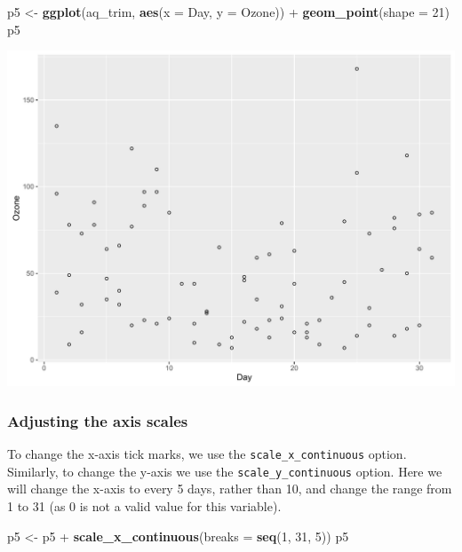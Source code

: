 \documentclass[]{article}
\newenvironment{Shaded}{\begin{snugshade}}{\end{snugshade}}
\newcommand{\KeywordTok}[1]{\textcolor[rgb]{0.13,0.29,0.53}{\textbf{{#1}}}}
\newcommand{\DataTypeTok}[1]{\textcolor[rgb]{0.13,0.29,0.53}{{#1}}}
\newcommand{\DecValTok}[1]{\textcolor[rgb]{0.00,0.00,0.81}{{#1}}}
\newcommand{\StringTok}[1]{\textcolor[rgb]{0.31,0.60,0.02}{{#1}}}
\newcommand{\NormalTok}[1]{{#1}}
\begin{document}
\begin{Shaded}
\begin{Highlighting}[]
\NormalTok{p5 <-}\StringTok{ }\KeywordTok{ggplot}\NormalTok{(aq_trim, }\KeywordTok{aes}\NormalTok{(}\DataTypeTok{x =} \NormalTok{Day, }\DataTypeTok{y =} \NormalTok{Ozone)) +}\StringTok{ }\KeywordTok{geom_point}\NormalTok{(}\DataTypeTok{shape =} \DecValTok{21}\NormalTok{)}
\NormalTok{p5}
\end{Highlighting}
\end{Shaded}

\begin{center}\includegraphics{0_all_posts_pdf/scatter_2-1} \end{center}

\subsubsection{Adjusting the axis
scales}\label{adjusting-the-axis-scales}

To change the x-axis tick marks, we use the
\texttt{scale\_x\_continuous} option. Similarly, to change the y-axis we
use the \texttt{scale\_y\_continuous} option. Here we will change the
x-axis to every 5 days, rather than 10, and change the range from 1 to
31 (as 0 is not a valid value for this variable).

\begin{Shaded}
\begin{Highlighting}[]
\NormalTok{p5 <-}\StringTok{ }\NormalTok{p5 +}\StringTok{ }\KeywordTok{scale_x_continuous}\NormalTok{(}\DataTypeTok{breaks =} \KeywordTok{seq}\NormalTok{(}\DecValTok{1}\NormalTok{, }\DecValTok{31}\NormalTok{, }\DecValTok{5}\NormalTok{))}
\NormalTok{p5}
\end{Highlighting}
\end{Shaded}
\end{document}
